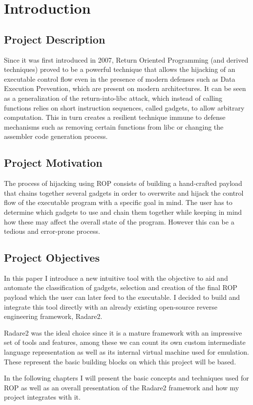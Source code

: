 \chapter{Introduction}
\label{chapter:intro}

\section{Project Description}
\label{sec:proj}



Since it was first introduced in 2007, Return Oriented Programming\cite{shacham2007rop} (and derived techniques) proved to be a powerful technique that allows the hijacking of an executable control flow even in the presence of modern defenses such as Data Execution Prevention, which are present on modern architectures. It can be seen as a generalization of the return-into-libc attack, which instead of calling functions relies on short instruction sequences, called gadgets, to allow arbitrary computation. This in turn creates a resilient technique immune to defense mechanisms such as removing certain functions from libc or changing the assembler code generation process.

\section{Project Motivation}

The process of hijacking using ROP consists of building a hand-crafted payload that chains together several gadgets in order to overwrite and hijack the control flow of the executable program with a specific goal in mind. The user has to determine which gadgets to use and chain them together while keeping in mind how these may affect the overall state of the program. However this can be a tedious and error-prone process.

\section{Project Objectives}

In this paper I introduce a new intuitive tool with the objective to aid and automate the classification of gadgets, selection and creation of the final ROP payload which the user can later feed to the executable. I decided to build and integrate this tool directly with an already existing open-source reverse engineering framework, Radare2.

Radare2 was the ideal choice since it is a mature framework with an impressive set of tools and features, among these we can count its own custom intermediate language representation as well as its internal virtual machine used for emulation. These represent the basic building blocks on which this project will be based.

In the following chapters I will present the basic concepts and techniques used for ROP as well as an overall presentation of the Radare2 framework and how my project integrates with it.

